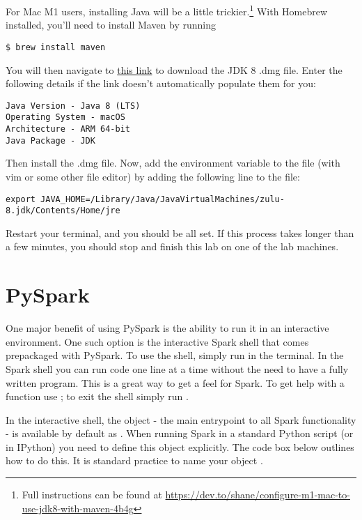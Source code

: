 For Mac M1 users, installing Java will be a little trickier.\footnote{Full instructions can be found at \href{https://dev.to/shane/configure-m1-mac-to-use-jdk8-with-maven-4b4g}{https://dev.to/shane/configure-m1-mac-to-use-jdk8-with-maven-4b4g}}
With Homebrew installed, you'll need to install Maven by running 
\begin{lstlisting}
$ brew install maven 
\end{lstlisting}
You will then navigate to \textcolor{red}{\href{https://www.azul.com/downloads/?version=java-8-lts&os=macos&architecture=arm-64-bit&package=jdk}{this link}} to download the JDK 8 .dmg file.
Enter the following details if the link doesn't automatically populate them for you:
\begin{lstlisting}
Java Version - Java 8 (LTS)
Operating System - macOS
Architecture - ARM 64-bit
Java Package - JDK
\end{lstlisting}
Then install the .dmg file.
Now, add the  environment variable to the  file (with vim or some other file editor) by adding the following line to the file:
\begin{lstlisting}
export JAVA_HOME=/Library/Java/JavaVirtualMachines/zulu-8.jdk/Contents/Home/jre
\end{lstlisting}
Restart your terminal, and you should be all set.
If this process takes longer than a few minutes, you should stop and finish this lab on one of the lab machines.


\section*{PySpark} %
One major benefit of using PySpark is the ability to run it in an interactive environment. 
One such option is the interactive Spark shell that comes prepackaged with PySpark. 
To use the shell, simply run  in the terminal. 
In the Spark shell you can run code one line at a time without the need to have a fully written program. This is a great way to get a feel for Spark. 
To get help with a function use ; to exit the shell simply run .

In the interactive shell, the  object - the main entrypoint to all Spark functionality - is available by default as . 
When running Spark in a standard Python script (or in IPython) you need to define this object explicitly. The code box below outlines how to do this. 
It is standard practice to name your  object .

